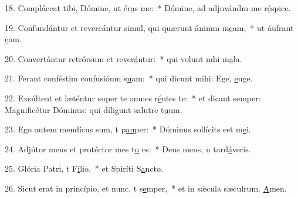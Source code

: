 18. Compláceat tibi, Dómine, ut ér\uline{a}s me:~* Dómine, ad adjuvándm me r\uline{é}spice.\par 
19. Confundántur et revereántur simul, qui quærunt ánimm m\uline{e}am,~* ut áufrant \uline{e}am.\par 
20. Convertántur retrórsum et rever\uline{á}ntur:~* qui volunt mhi m\uline{a}la.\par 
21. Ferant conféstim confusiónm s\uline{u}am:~* qui dicunt mihi: Ege, \uline{e}uge.\par 
22. Exsúltent et læténtur super te omnes r\uline{é}ntes te:~* et dicant semper: Magnificétur Dóminus: qui díligunt salutre t\uline{u}um.\par 
23. Ego autem mendícus sum, t p\uline{au}per:~* Dóminus sollícits est m\uline{e}i.\par 
24. Adjútor meus et protéctor mes t\uline{u} es:~* Deus meus, n tard\uline{á}veris.\par 
25. Glória Patri, t F\uline{í}lio,~* et Spiríti S\uline{a}ncto.\par 
26. Sicut erat in princípio, et nunc, t s\uline{e}mper,~* et in sǽcula sæculrum. \uline{A}men.\par 
